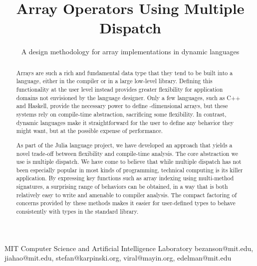 \documentclass[preprint]{sigplanconf}
\begin{document}
\setlength{\pdfpageheight}{\paperheight}
\setlength{\pdfpagewidth}{\paperwidth}




\exclusivelicense                



     



\title{ Array Operators Using Multiple Dispatch }
\subtitle{A design methodology for array implementations in dynamic languages}

           {MIT Computer Science and Artificial Intelligence Laboratory}
  { bezanson@mit.edu, jiahao@mit.edu, stefan@karpinski.org, viral@mayin.org, edelman@mit.edu }

\maketitle

\begin{abstract}

Arrays are such a rich and fundamental data type that they tend to be built into
a language, either in the compiler or in a large low-level library.
Defining this functionality at the user level instead provides greater
flexibility for application domains not envisioned by the language designer.
Only a few languages, such as C++ and Haskell, provide the necessary power to define
-dimensional arrays, but these systems rely on compile-time abstraction,
sacrificing some flexibility.
In contrast, dynamic languages make it straightforward for the user to define any
behavior they might want, but at the possible expense of performance.

As part of the Julia language project, we have developed an approach that yields
a novel trade-off between flexibility and compile-time analysis. The core
abstraction we use is multiple dispatch.
We have come to believe that while multiple dispatch has not been especially popular
in most kinds of programming, technical computing is its killer application.
By expressing key functions such as array indexing using multi-method
signatures, a surprising range of behaviors can be obtained, in a way that is
both relatively easy to write and amenable to compiler analysis.
The compact factoring of concerns provided by these methods makes it easier
for user-defined types to behave consistently with types in the standard
library.





\end{abstract}
\end{document}
